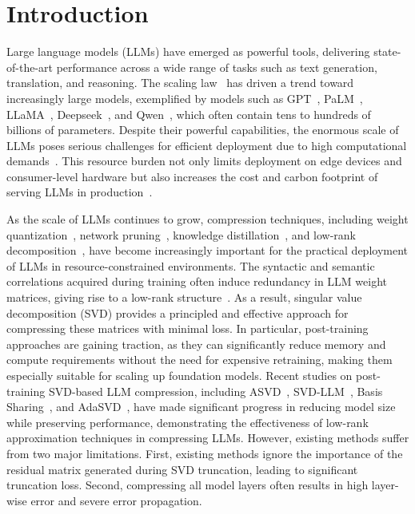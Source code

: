 \section{Introduction}
Large language models (LLMs) have emerged as powerful tools, delivering state-of-the-art performance across a wide range of tasks such as text generation, translation, and reasoning.
The scaling law~\cite{kaplan2020scaling} has driven a trend toward increasingly large models, exemplified by models such as GPT~\cite{brown2020language}, PaLM~\cite{chowdhery2023palm}, LLaMA~\cite{touvron2023llama}, Deepseek~\cite{liu2024deepseek}, and Qwen~\cite{yang2025qwen3}, which often contain tens to hundreds of billions of parameters. 
Despite their powerful capabilities, the enormous scale of LLMs poses serious challenges for efficient deployment due to high computational demands~\cite{sheng2023flexgen,zhou2024survey,wang2024model}. 
This resource burden not only limits deployment on edge devices and consumer-level hardware but also increases the cost and carbon footprint of serving LLMs in production~\cite{strubell2020energy,patterson2022carbon}.

As the scale of LLMs continues to grow, compression techniques, including weight quantization~\cite{frantar2022gptq,lin2024awq,huang2024billm,li2024arb}, network pruning~\cite{ma2023llm,frantar2023sparsegpt,sunsimple,gao2024disp,su2026rose}, knowledge distillation~\cite{gu2023minillm,yang2024survey,xu2024survey,zhang2024dual}, and low-rank decomposition~\cite{hsulanguage,kaushal2023lord,yuan2023asvd,wang2024svd,li2025adasvd}, have become increasingly important for the practical deployment of LLMs in resource-constrained environments. 
The syntactic and semantic correlations acquired during training often induce redundancy in LLM weight matrices, giving rise to a low-rank structure~\cite{saha2024compressing}. 
As a result, singular value decomposition (SVD) provides a principled and effective approach for compressing these matrices with minimal loss. 
In particular, post-training approaches are gaining traction, as they can significantly reduce memory and compute requirements without the need for expensive retraining, making them especially suitable for scaling up foundation models. 
Recent studies on post-training SVD-based LLM compression, including ASVD~\cite{yuan2023asvd}, SVD-LLM~\cite{wang2024svd}, Basis Sharing~\cite{wang2024basis}, and AdaSVD~\cite{li2025adasvd}, have made significant progress in reducing model size while preserving performance, demonstrating the effectiveness of low-rank approximation techniques in compressing LLMs. 
However, existing methods suffer from two major limitations. First, existing methods ignore the importance of the residual matrix generated during SVD truncation, leading to significant truncation loss. Second, compressing all model layers often results in high layer-wise error and severe error propagation.

